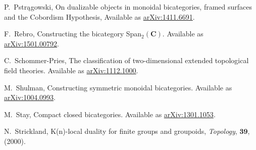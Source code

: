 \documentclass[11pt]{amsart}
\newcommand{\cat}[1]{\mathbf{#1}}
\theoremstyle{remark}
\theoremstyle{definition}
\begin{document}
\begin{thebibliography}{100}
P.~Pstrągowski,
On dualizable objects in monoidal bicategories, framed surfaces and the Cobordism Hypothesis, 
Available as \href{https://arxiv.org/abs/1411.6691}{arXiv:1411.6691}.

F.~Rebro, 
Constructing the bicategory Span$_{2}(\cat{C})$. 
Available as \href{https://arxiv.org/abs/1501.00792}{arXiv:1501.00792}.

C.~Schommer-Pries,
The classification of two-dimensional extended topological field theories. 
Available as \href{https://arxiv.org/abs/1112.1000}{arXiv:1112.1000}.

M.~Shulman, 
Constructing symmetric monoidal bicategories. 
Available as \href{http://arxiv.org/abs/1004.0993}{arXiv:1004.0993}.

 M.~Stay, 
Compact closed bicategories. 
Available as \href{http://arxiv.org/abs/1301.1053}{arXiv:1301.1053}.

N.\ Strickland,
K(n)-local duality for finite groups and groupoids,
\emph{Topology}, $\mathbf{39}$, (2000).

\end{thebibliography}


%
%
\end{document}
